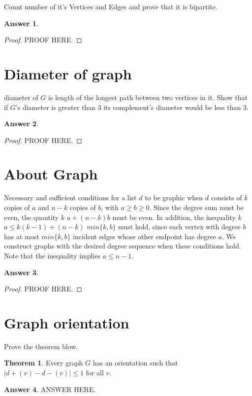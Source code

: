 \documentclass[a4paper]{article}
\renewcommand{\(}{\left(}
\renewcommand{\)}{\right)}
\theoremstyle{plain}
\theoremstyle{plain}
\theoremstyle{definition}
\newtheorem*{answer}{Answer}
\newtheorem{theorem}{Theorem}[section]
\begin{document}
Count number of it's Vertices and Edges and prove that it is bipartite.
\begin{shaded}
\begin{answer}
\begin{proof}
PROOF HERE.
\end{proof}
\end{answer}
\end{shaded}

\section{Diameter of graph}
diameter of $G$ is length of the longest path between two vertices in it.
Show that if $G$'s diameter is greater than 3 its complement's diameter would be less than 3.
\begin{shaded}
\begin{answer}
\begin{proof}
PROOF HERE.
\end{proof}
\end{answer}
\end{shaded}

\section{About Graph}
Necessary and sufficient conditions for a list $d$ to be graphic when $d$ consists of $k$ copies of $a$ and $n − k$ copies of $b$, with $a \geq b \geq 0$. Since the degree sum must be even, the quantity $k$ $a + (n − k)b$ must be even. In addition, the inequality $k$ $a \leq k(k − 1) + (n − k)$ $min\{k, b\}$ must hold, since each vertex with degree $b$ has at most $min\{k, b\}$ incident edges whose other endpoint has degree $a$. We construct graphs with the desired degree sequence when these conditions hold. Note that the inequality implies $a \leq n − 1$.
\begin{shaded}
\begin{answer}
\begin{proof}
PROOF HERE.
\end{proof}
\end{answer}
\end{shaded}

\section{Graph orientation}
Prove the theorem blow.
\begin{theorem}
Every graph $G$ has an orientation such that $|d +(v) - d-(v)| \leq 1$ for all $v$.
\end{theorem}
\begin{shaded}
\begin{answer}
ANSWER HERE.
\end{answer}
\end{shaded}
\end{document}
